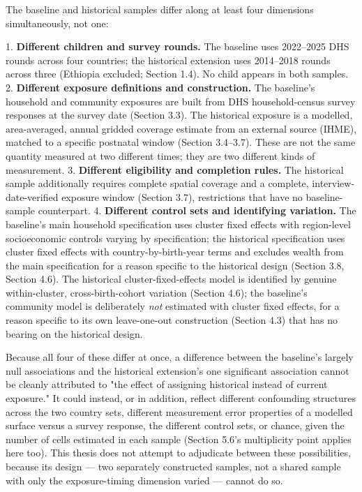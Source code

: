 The baseline and historical samples differ along at least four dimensions simultaneously, not one:

1. \textbf{Different children and survey rounds.} The baseline uses 2022--2025 DHS rounds across four countries; the historical extension uses 2014--2018 rounds across three (Ethiopia excluded; Section 1.4). No child appears in both samples.
2. \textbf{Different exposure definitions and construction.} The baseline's household and community exposures are built from DHS household-census survey responses at the survey date (Section 3.3). The historical exposure is a modelled, area-averaged, annual gridded coverage estimate from an external source (IHME), matched to a specific postnatal window (Section 3.4--3.7). These are not the same quantity measured at two different times; they are two different kinds of measurement.
3. \textbf{Different eligibility and completion rules.} The historical sample additionally requires complete spatial coverage and a complete, interview-date-verified exposure window (Section 3.7), restrictions that have no baseline-sample counterpart.
4. \textbf{Different control sets and identifying variation.} The baseline's main household specification uses cluster fixed effects with region-level socioeconomic controls varying by specification; the historical specification uses cluster fixed effects with country-by-birth-year terms and excludes wealth from the main specification for a reason specific to the historical design (Section 3.8, Section 4.6). The historical cluster-fixed-effects model is identified by genuine within-cluster, cross-birth-cohort variation (Section 4.6); the baseline's community model is deliberately \textit{not} estimated with cluster fixed effects, for a reason specific to its own leave-one-out construction (Section 4.3) that has no bearing on the historical design.

Because all four of these differ at once, a difference between the baseline's largely null associations and the historical extension's one significant association cannot be cleanly attributed to "the effect of assigning historical instead of current exposure." It could instead, or in addition, reflect different confounding structures across the two country sets, different measurement error properties of a modelled surface versus a survey response, the different control sets, or chance, given the number of cells estimated in each sample (Section 5.6's multiplicity point applies here too). This thesis does not attempt to adjudicate between these possibilities, because its design --- two separately constructed samples, not a shared sample with only the exposure-timing dimension varied --- cannot do so.

